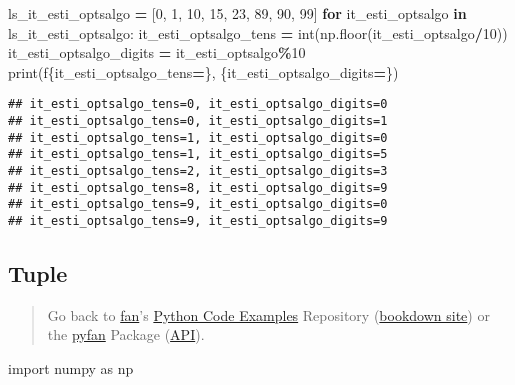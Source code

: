 \documentclass[
]{book}
\newenvironment{Shaded}{\begin{snugshade}}{\end{snugshade}}
\newcommand{\BuiltInTok}[1]{#1}
\newcommand{\ControlFlowTok}[1]{\textcolor[rgb]{0.13,0.29,0.53}{\textbf{#1}}}
\newcommand{\DecValTok}[1]{\textcolor[rgb]{0.00,0.00,0.81}{#1}}
\newcommand{\ImportTok}[1]{#1}
\newcommand{\KeywordTok}[1]{\textcolor[rgb]{0.13,0.29,0.53}{\textbf{#1}}}
\newcommand{\NormalTok}[1]{#1}
\newcommand{\OperatorTok}[1]{\textcolor[rgb]{0.81,0.36,0.00}{\textbf{#1}}}
\newcommand{\SpecialCharTok}[1]{\textcolor[rgb]{0.00,0.00,0.00}{#1}}
\newcommand{\SpecialStringTok}[1]{\textcolor[rgb]{0.31,0.60,0.02}{#1}}
\begin{document}
\begin{Shaded}
\begin{Highlighting}[]
\NormalTok{ls\_it\_esti\_optsalgo }\OperatorTok{=}\NormalTok{ [}\DecValTok{0}\NormalTok{, }\DecValTok{1}\NormalTok{, }\DecValTok{10}\NormalTok{, }\DecValTok{15}\NormalTok{, }\DecValTok{23}\NormalTok{, }\DecValTok{89}\NormalTok{, }\DecValTok{90}\NormalTok{, }\DecValTok{99}\NormalTok{]}
\ControlFlowTok{for}\NormalTok{ it\_esti\_optsalgo }\KeywordTok{in}\NormalTok{ ls\_it\_esti\_optsalgo:}
\NormalTok{    it\_esti\_optsalgo\_tens }\OperatorTok{=} \BuiltInTok{int}\NormalTok{(np.floor(it\_esti\_optsalgo}\OperatorTok{/}\DecValTok{10}\NormalTok{))}
\NormalTok{    it\_esti\_optsalgo\_digits }\OperatorTok{=}\NormalTok{ it\_esti\_optsalgo}\OperatorTok{\%}\DecValTok{10}
    \BuiltInTok{print}\NormalTok{(}\SpecialStringTok{f\textquotesingle{}}\SpecialCharTok{\{}\NormalTok{it\_esti\_optsalgo\_tens}\OperatorTok{=}\SpecialCharTok{\}}\SpecialStringTok{, }\SpecialCharTok{\{}\NormalTok{it\_esti\_optsalgo\_digits}\OperatorTok{=}\SpecialCharTok{\}}\SpecialStringTok{\textquotesingle{}}\NormalTok{)}
\end{Highlighting}
\end{Shaded}

\begin{verbatim}
## it_esti_optsalgo_tens=0, it_esti_optsalgo_digits=0
## it_esti_optsalgo_tens=0, it_esti_optsalgo_digits=1
## it_esti_optsalgo_tens=1, it_esti_optsalgo_digits=0
## it_esti_optsalgo_tens=1, it_esti_optsalgo_digits=5
## it_esti_optsalgo_tens=2, it_esti_optsalgo_digits=3
## it_esti_optsalgo_tens=8, it_esti_optsalgo_digits=9
## it_esti_optsalgo_tens=9, it_esti_optsalgo_digits=0
## it_esti_optsalgo_tens=9, it_esti_optsalgo_digits=9
\end{verbatim}

\hypertarget{tuple}{%
\subsection{Tuple}\label{tuple}}

\begin{quote}
Go back to \href{http://fanwangecon.github.io/}{fan}'s \href{https://fanwangecon.github.io/Py4Econ/}{Python Code Examples} Repository (\href{https://fanwangecon.github.io/Py4Econ/bookdown}{bookdown site}) or the \href{https://pyfan.readthedocs.io/en/latest/}{pyfan} Package (\href{https://pyfan.readthedocs.io/en/latest/reference.html}{API}).
\end{quote}

\begin{Shaded}
\begin{Highlighting}[]
\ImportTok{import}\NormalTok{ numpy }\ImportTok{as}\NormalTok{ np}
\end{Highlighting}
\end{Shaded}
\end{document}
